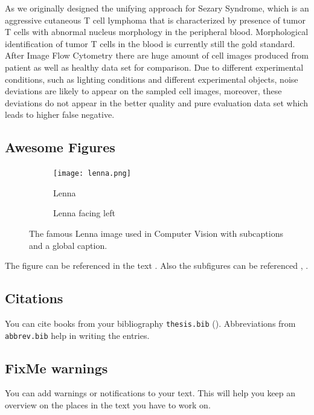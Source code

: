As we originally designed the unifying approach for Sezary Syndrome, which is an aggressive cutaneous T cell lymphoma that is characterized by presence of tumor T cells with abnormal nucleus morphology in the peripheral blood. Morphological identification of tumor T cells in the blood is currently still the gold standard.
After Image Flow Cytometry there are huge amount of cell images produced from patient as well as healthy data set for comparison. Due to different experimental conditions, such as lighting conditions and different experimental objects, noise deviations are likely to appear on the sampled cell images, moreover, these deviations do not appear in the better quality and pure evaluation data set which leads to higher false negative.
\subsection[Awesome Figures in the TOC]{Awesome Figures} %
\label{sub:figures}
\begin{figure}[ht]
	\begin{center}
		\begin{subfigure}[b]{0.49\textwidth}
			\texttt{[image: lenna.png]}
			\caption{Lenna}
			\label{fig:lenna}
		\end{subfigure}
		\begin{subfigure}[b]{0.49\textwidth}
			\caption{Lenna facing left}
			\label{fig:lenna_facing_left}
		\end{subfigure}
	\end{center}
	\caption{The famous Lenna image used in Computer Vision with subcaptions and a global caption.}
	\label{fig:lennas}
\end{figure}
The figure can be referenced in the text \eg{}.
Also the subfigures can be referenced \eg{}, .

\subsection{Citations} %
\label{sub:citations}
You can cite books from your bibliography \texttt{thesis.bib} (\eg \cite{cochrane}).
Abbreviations from \texttt{abbrev.bib} help in writing the entries.

\subsection{FixMe warnings}
\label{sub:fixme}
You can add warnings or notifications to your text.
This will help you keep an overview on the places in the text you have to work on.

